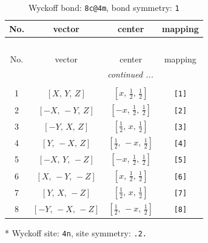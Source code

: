 \documentclass[fleqn,8pt]{jsarticle}
\begin{document}
\renewcommand{\arraystretch}{1.2}
\begin{longtable}{cccc}
\caption{Wyckoff bond: {\tt 8c@4m}, bond symmetry: {\tt 1}}
 \\
 \hline \hline
No. & vector & center & mapping \\ \hline \endfirsthead

\multicolumn{3}{l}{\tablename\ \thetable{}} \\
 \hline \hline
No. & vector & center & mapping \\ \hline \endhead

 \hline \hline
\multicolumn{3}{r}{\footnotesize\it continued ...} \\ \endfoot

 \hline \hline
\multicolumn{3}{r}{} \\ \endlastfoot

1 & $\left[ X,\, Y,\, Z \right]$ & $\left[ x,\, \frac{1}{2},\, \frac{1}{2} \right]$ & {\tt [1]} \\ \hline
2 & $\left[ - X,\, - Y,\, Z \right]$ & $\left[ - x,\, \frac{1}{2},\, \frac{1}{2} \right]$ & {\tt [2]} \\ \hline
3 & $\left[ - Y,\, X,\, Z \right]$ & $\left[ \frac{1}{2},\, x,\, \frac{1}{2} \right]$ & {\tt [3]} \\ \hline
4 & $\left[ Y,\, - X,\, Z \right]$ & $\left[ \frac{1}{2},\, - x,\, \frac{1}{2} \right]$ & {\tt [4]} \\ \hline
5 & $\left[ - X,\, Y,\, - Z \right]$ & $\left[ - x,\, \frac{1}{2},\, \frac{1}{2} \right]$ & {\tt [5]} \\ \hline
6 & $\left[ X,\, - Y,\, - Z \right]$ & $\left[ x,\, \frac{1}{2},\, \frac{1}{2} \right]$ & {\tt [6]} \\ \hline
7 & $\left[ Y,\, X,\, - Z \right]$ & $\left[ \frac{1}{2},\, x,\, \frac{1}{2} \right]$ & {\tt [7]} \\ \hline
8 & $\left[ - Y,\, - X,\, - Z \right]$ & $\left[ \frac{1}{2},\, - x,\, \frac{1}{2} \right]$ & {\tt [8]} \\
\end{longtable}
* Wyckoff site: {\tt 4n}, site symmetry: {\tt .2.}
\renewcommand{\arraystretch}{1.2}
\end{document}
